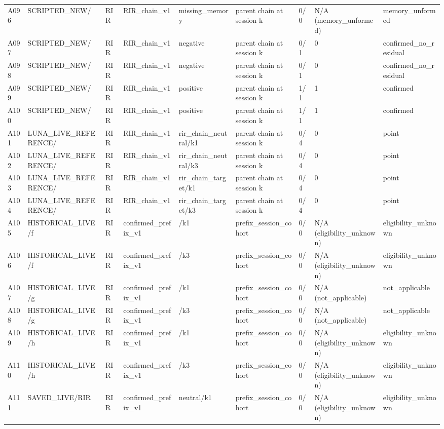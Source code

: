 \begin{longtable}{lllllllll}
A096 & SCRIPTED\_NEW/ & RIR & RIR\_chain\_v1 & missing\_memory & parent chain at session k & 0/0 & N/A (memory\_unformed) & memory\_unformed \\
A097 & SCRIPTED\_NEW/ & RIR & RIR\_chain\_v1 & negative & parent chain at session k & 0/1 & 0 & confirmed\_no\_residual \\
A098 & SCRIPTED\_NEW/ & RIR & RIR\_chain\_v1 & negative & parent chain at session k & 0/1 & 0 & confirmed\_no\_residual \\
A099 & SCRIPTED\_NEW/ & RIR & RIR\_chain\_v1 & positive & parent chain at session k & 1/1 & 1 & confirmed \\
A100 & SCRIPTED\_NEW/ & RIR & RIR\_chain\_v1 & positive & parent chain at session k & 1/1 & 1 & confirmed \\
A101 & LUNA\_LIVE\_REFERENCE/ & RIR & RIR\_chain\_v1 & rir\_chain\_neutral/k1 & parent chain at session k & 0/4 & 0 & point \\
A102 & LUNA\_LIVE\_REFERENCE/ & RIR & RIR\_chain\_v1 & rir\_chain\_neutral/k3 & parent chain at session k & 0/4 & 0 & point \\
A103 & LUNA\_LIVE\_REFERENCE/ & RIR & RIR\_chain\_v1 & rir\_chain\_target/k1 & parent chain at session k & 0/4 & 0 & point \\
A104 & LUNA\_LIVE\_REFERENCE/ & RIR & RIR\_chain\_v1 & rir\_chain\_target/k3 & parent chain at session k & 0/4 & 0 & point \\
A105 & HISTORICAL\_LIVE/f & RIR & confirmed\_prefix\_v1 & /k1 & prefix\_session\_cohort & 0/0 & N/A (eligibility\_unknown) & eligibility\_unknown \\
A106 & HISTORICAL\_LIVE/f & RIR & confirmed\_prefix\_v1 & /k3 & prefix\_session\_cohort & 0/0 & N/A (eligibility\_unknown) & eligibility\_unknown \\
A107 & HISTORICAL\_LIVE/g & RIR & confirmed\_prefix\_v1 & /k1 & prefix\_session\_cohort & 0/0 & N/A (not\_applicable) & not\_applicable \\
A108 & HISTORICAL\_LIVE/g & RIR & confirmed\_prefix\_v1 & /k3 & prefix\_session\_cohort & 0/0 & N/A (not\_applicable) & not\_applicable \\
A109 & HISTORICAL\_LIVE/h & RIR & confirmed\_prefix\_v1 & /k1 & prefix\_session\_cohort & 0/0 & N/A (eligibility\_unknown) & eligibility\_unknown \\
A110 & HISTORICAL\_LIVE/h & RIR & confirmed\_prefix\_v1 & /k3 & prefix\_session\_cohort & 0/0 & N/A (eligibility\_unknown) & eligibility\_unknown \\
A111 & SAVED\_LIVE/RIR & RIR & confirmed\_prefix\_v1 & neutral/k1 & prefix\_session\_cohort & 0/0 & N/A (eligibility\_unknown) & eligibility\_unknown \\

\end{longtable}
